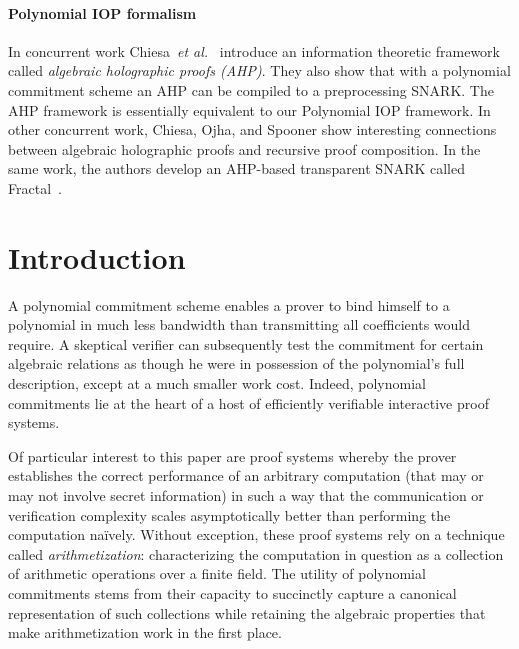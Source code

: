 \paragraph{Polynomial IOP formalism}
In concurrent work Chiesa~\emph{et al.}~\cite{Marlin} introduce an information theoretic framework called \emph{algebraic holographic proofs (AHP)}. They also show that with a polynomial commitment scheme an AHP can be compiled to a preprocessing SNARK. The AHP framework is essentially equivalent to our Polynomial IOP framework. %
In other concurrent work, Chiesa, Ojha, and Spooner show interesting connections between algebraic holographic proofs and recursive proof composition. In the same work, the authors develop an AHP-based transparent SNARK called \textsf{Fractal}~\cite{Fractal}.



\section{Introduction}

A polynomial commitment scheme enables a prover to bind himself to a polynomial in much less bandwidth than transmitting all coefficients would require. A skeptical verifier can subsequently test the commitment for certain algebraic relations as though he were in possession of the polynomial's full description, except at a much smaller work cost. Indeed, polynomial commitments lie at the heart of a host of efficiently verifiable interactive proof systems.

Of particular interest to this paper are proof systems whereby the prover establishes the correct performance of an arbitrary computation (that may or may not involve secret information) in such a way that the communication or verification complexity scales asymptotically better than performing the computation naïvely. Without exception, these proof systems rely on a technique called \emph{arithmetization}: characterizing the computation in question as a collection of arithmetic operations over a finite field. The utility of polynomial commitments stems from their capacity to succinctly capture a canonical representation of such collections while retaining the algebraic properties that make arithmetization work in the first place.

